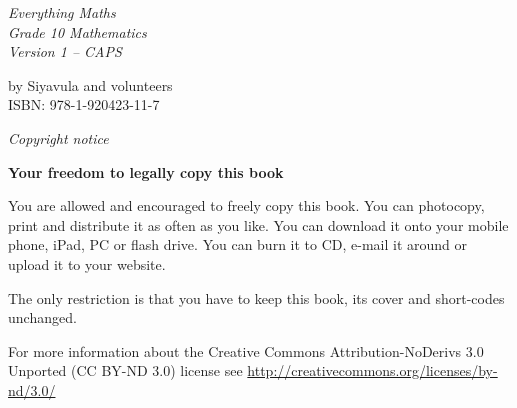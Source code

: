 \newpage
\thispagestyle{empty}
\mbox{}

\newpage
\begin{center}
    \thispagestyle{empty}

    \vspace*{4in}

    {\normalfont\sffamily\fontsize{36}\normalfont\itshape{Everything Maths } \\ \vspace*{1cm}
    {\normalfont\sffamily\fontsize{22}\normalfont\itshape{Grade 10 Mathematics}}
    \vspace*{1in} \\
    \LARGE Version 1 -- CAPS \\

   {\vspace*{2in}
     by Siyavula and volunteers \\

ISBN: 978-1-920423-11-7
  

\vfill

    }}

\end{center}






\newpage
\thispagestyle{empty}
{
\begin{center}
\normalfont\sffamily\fontsize{22}\normalfont\itshape Copyright notice\\

\vspace*{1in}

\textbf{Your freedom to legally copy this book}\\

\end{center}
}

{\LARGE
You are allowed and encouraged to freely copy this book. You can photocopy, print and distribute it as
often as you like. You can download it onto your mobile phone, iPad, PC or flash drive. You can burn it
to CD, e-mail it around or upload it to your website. \par

The only restriction is that you have to keep this book, its cover and short-codes unchanged.\par

For more information about the Creative Commons Attribution-NoDerivs 3.0 Unported (CC BY-ND
3.0) license see \underline{http://creativecommons.org/licenses/by-nd/3.0/}}\\

